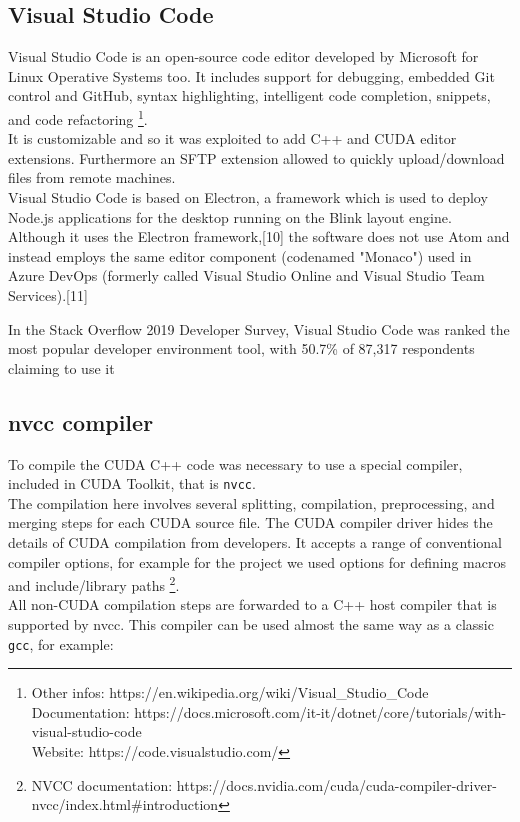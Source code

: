 	
	
	
	
	
	
	
	
	
	
	\subsection{Visual Studio Code}
		Visual Studio Code is an open-source code editor developed by Microsoft for Linux Operative Systems too. It includes support for debugging, embedded Git control and GitHub, syntax highlighting, intelligent code completion, snippets, and code refactoring \footnote{Other infos: https://en.wikipedia.org/wiki/Visual\_Studio\_Code \\
		Documentation: https://docs.microsoft.com/it-it/dotnet/core/tutorials/with-visual-studio-code \\ 
			 Website: https://code.visualstudio.com/}.\\
		
		It is customizable and so it was exploited to add C++ and CUDA editor extensions.
		Furthermore an SFTP extension allowed to quickly upload/download files from remote machines. \\
		 
		 Visual Studio Code is based on Electron, a framework which is used to deploy Node.js applications for the desktop running on the Blink layout engine. Although it uses the Electron framework,[10] the software does not use Atom and instead employs the same editor component (codenamed "Monaco") used in Azure DevOps (formerly called Visual Studio Online and Visual Studio Team Services).[11]
		 
		 In the Stack Overflow 2019 Developer Survey, Visual Studio Code was ranked the most popular developer environment tool, with 50.7\% of 87,317 respondents claiming to use it
		 
	\subsection{nvcc compiler}
		To compile the CUDA C++ code was necessary to use a special compiler, included in CUDA Toolkit, that is \texttt{nvcc}.\\
		The compilation here involves several splitting, compilation, preprocessing, and merging steps for each CUDA source file. The CUDA compiler driver hides the details of CUDA compilation from developers. It accepts a range of conventional compiler options, for example for the project we used options for defining macros and include/library paths \footnote{NVCC documentation: https://docs.nvidia.com/cuda/cuda-compiler-driver-nvcc/index.html\#introduction}.\\ 
		All non-CUDA compilation steps are forwarded to a C++ host compiler that is supported by nvcc. 
		This compiler can be used almost the same way as a classic \texttt{gcc}, for example:\\
		
